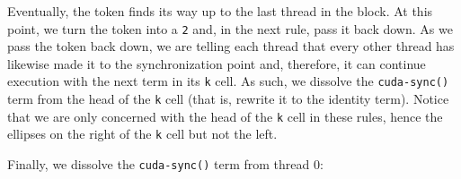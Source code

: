 \vspace{0.5em}
{\footnotesize {}
}

Eventually, the token finds its way up to the last thread in the block. At this
point, we turn the token into a {\tt 2} and, in the next rule, pass it back
down. As we pass the token back down, we are telling each thread that every
other thread has likewise made it to the synchronization point and, therefore,
it can continue execution with the next term in its {\tt k} cell. As such, we
dissolve the {\tt cuda-sync()} term from the head of the {\tt k} cell (that is,
rewrite it to the identity term). Notice that we are only concerned with the
head of the {\tt k} cell in these rules, hence the ellipses on the right of the
{\tt k} cell but not the left.

\vspace{0.5em}
{\footnotesize {}
}

Finally, we dissolve the {\tt cuda-sync()} term from thread 0:

\vspace{0.5em}
{\footnotesize
{}
}

